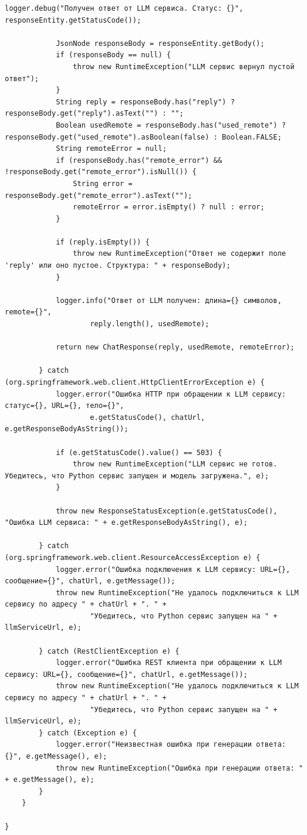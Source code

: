 \begin{lstlisting}[basicstyle=\tiny\ttfamily,breaklines=true]
            logger.debug("Получен ответ от LLM сервиса. Статус: {}", responseEntity.getStatusCode());

            JsonNode responseBody = responseEntity.getBody();
            if (responseBody == null) {
                throw new RuntimeException("LLM сервис вернул пустой ответ");
            }
            String reply = responseBody.has("reply") ? responseBody.get("reply").asText("") : "";
            Boolean usedRemote = responseBody.has("used_remote") ? responseBody.get("used_remote").asBoolean(false) : Boolean.FALSE;
            String remoteError = null;
            if (responseBody.has("remote_error") && !responseBody.get("remote_error").isNull()) {
                String error = responseBody.get("remote_error").asText("");
                remoteError = error.isEmpty() ? null : error;
            }

            if (reply.isEmpty()) {
                throw new RuntimeException("Ответ не содержит поле 'reply' или оно пустое. Структура: " + responseBody);
            }

            logger.info("Ответ от LLM получен: длина={} символов, remote={}",
                    reply.length(), usedRemote);

            return new ChatResponse(reply, usedRemote, remoteError);
            
        } catch (org.springframework.web.client.HttpClientErrorException e) {
            logger.error("Ошибка HTTP при обращении к LLM сервису: статус={}, URL={}, тело={}", 
                    e.getStatusCode(), chatUrl, e.getResponseBodyAsString());
            
            if (e.getStatusCode().value() == 503) {
                throw new RuntimeException("LLM сервис не готов. Убедитесь, что Python сервис запущен и модель загружена.", e);
            }
            
            throw new ResponseStatusException(e.getStatusCode(), "Ошибка LLM сервиса: " + e.getResponseBodyAsString(), e);
            
        } catch (org.springframework.web.client.ResourceAccessException e) {
            logger.error("Ошибка подключения к LLM сервису: URL={}, сообщение={}", chatUrl, e.getMessage());
            throw new RuntimeException("Не удалось подключиться к LLM сервису по адресу " + chatUrl + ". " +
                    "Убедитесь, что Python сервис запущен на " + llmServiceUrl, e);
            
        } catch (RestClientException e) {
            logger.error("Ошибка REST клиента при обращении к LLM сервису: URL={}, сообщение={}", chatUrl, e.getMessage());
            throw new RuntimeException("Не удалось подключиться к LLM сервису по адресу " + chatUrl + ". " +
                    "Убедитесь, что Python сервис запущен на " + llmServiceUrl, e);
        } catch (Exception e) {
            logger.error("Неизвестная ошибка при генерации ответа: {}", e.getMessage(), e);
            throw new RuntimeException("Ошибка при генерации ответа: " + e.getMessage(), e);
        }
    }

}
\end{lstlisting}


